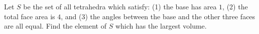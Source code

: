 Let $S$ be the set of all tetrahedra which satisfy:
(1) the base has area $1$,
(2) the total face area is $4$, and
(3) the angles between the base and the other three faces are all equal.
Find the element of $S$ which has the largest volume.